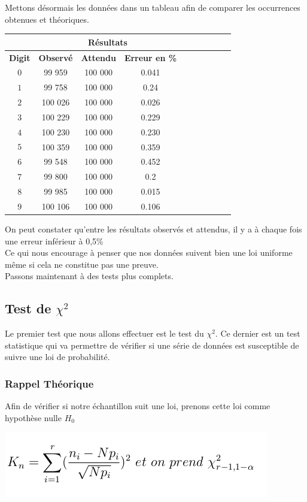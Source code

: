 \documentclass[french]{article}
\begin{document}
\newpage
Mettons désormais les données dans un tableau afin de comparer les occurrences obtenues et théoriques.
\begin{longtable}{|c|c|c|c|c|c|c|c|c|c|}
	\hline
	& \multicolumn{3}{c|}{\textbf{Résultats}} \\ 
	\hline 
	\textbf{Digit}  & \textbf{Observé} & \textbf{Attendu} & \textbf{Erreur en \%} \\ 
	\hline 
	$$0$$ & 99 959 & 100 000 & 0.041\\ 
	\hline 
	$$1$$ & 99 758 & 100 000 & 0.24\\ 
	\hline 
	$$2$$ & 100 026 & 100 000 & 0.026 \\ 
	\hline 
	$$3$$ & 100 229 & 100 000 & 0.229\\ 
	\hline 
	$$4$$ & 100 230 & 100 000 & 0.230\\ 
	\hline 
	$$5$$ & 100 359 & 100 000 & 0.359\\ 
	\hline 
	$$6$$ & 99 548 & 100 000 & 0.452\\ 
	\hline 
	$$7$$ & 99 800 & 100 000 & 0.2\\ 
	\hline 
	$$8$$ & 99 985 & 100 000 & 0.015\\ 
	\hline 
	$$9$$ & 100 106 & 100 000 & 0.106\\ 
	\hline
\end{longtable}

On peut constater qu'entre les résultats observés et attendus, il y a à chaque fois une
erreur inférieur à 0,5\%
\\
Ce qui nous encourage à penser que nos données suivent bien une loi uniforme même si cela ne 
constitue pas une preuve.
\\
Passons maintenant à des tests plus complets.
\\
\subsection{Test de $\chi^{2}$ }
Le premier test que nous allons effectuer est le test du \textbf{$\chi^{2}$}. Ce dernier est un test statistique qui va permettre de vérifier si une série de données est susceptible de suivre une loi de probabilité.
\\

\subsubsection{Rappel Théorique}
Afin de vérifier si notre échantillon suit une loi, prenons cette loi comme hypothèse nulle \textit{$H_{0}$}
	\begin{center}
		\includegraphics[scale=0.60]{Archives/Images/khi2}
	\end{center}
		
\end{document}
